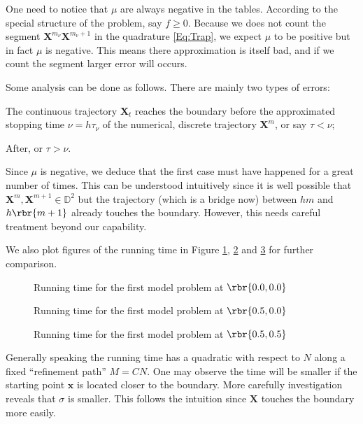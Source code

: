 \documentclass[english, nochinese]{pnote}
\begin{document}
One need to notice that $\mu$ are always negative in the tables. According to the special structure of the problem, say $ f \ge 0 $. Because we does not count the segment $ \bm{X}^{m_{\nu}} \bm{X}^{ m_{\nu} + 1 } $ in the quadrature \eqref{Eq:Trap}, we expect $\mu$ to be positive but in fact $\mu$ is negative. This means there approximation is itself bad, and if we count the segment larger error will occurs.

Some analysis can be done as follows. There are mainly two types of errors:
\begin{partlist}
\item The continuous trajectory $\bm{X}_t$ reaches the boundary before the approximated stopping time $ \nu = h \tau_{\nu} $ of the numerical, discrete trajectory $\bm{X}^m$, or say $ \tau < \nu $;
\item After, or $ \tau > \nu $.
\end{partlist}
Since $\mu$ is negative, we deduce that the first case must have happened for a great number of times. This can be understood intuitively since it is well possible that $ \bm{X}^m, \bm{X}^{ m + 1 } \in \mathbb{D}^2 $ but the trajectory (which is a bridge now) between $ h m $ and $ h \rbr{ m + 1 } $ already touches the boundary. However, this needs careful treatment beyond our capability.

We also plot figures of the running time in Figure \ref{Fig:EMTime11}, \ref{Fig:EMTime12} and \ref{Fig:EMTime13} for further comparison.

\begin{figure}[htbp]
\centering

\caption{Running time for the first model problem at $ \rbr{ 0.0, 0.0 } $}
\label{Fig:EMTime11}
\end{figure}

\begin{figure}[htbp]
\centering

\caption{Running time for the first model problem at $ \rbr{ 0.5, 0.0 } $}
\label{Fig:EMTime12}
\end{figure}

\begin{figure}[htbp]
\centering

\caption{Running time for the first model problem at $ \rbr{ 0.5, 0.5 } $}
\label{Fig:EMTime13}
\end{figure}

Generally speaking the running time has a quadratic with respect to $N$ along a fixed ``refinement path'' $ M = C N $. One may observe the time will be smaller if the starting point $\bm{x}$ is located closer to the boundary. More carefully investigation reveals that $\sigma$ is smaller. This follows the intuition since $\bm{X}$ touches the boundary more easily.
\end{document}
